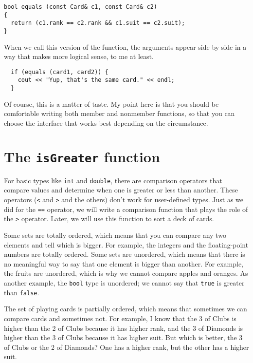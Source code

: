 \begin{lstlisting}
bool equals (const Card& c1, const Card& c2)
{
  return (c1.rank == c2.rank && c1.suit == c2.suit);
}
\end{lstlisting}
%
When we call this version of the function, the arguments
appear side-by-side in a way that makes more logical sense,
to me at least.

\begin{lstlisting}
  if (equals (card1, card2)) {
    cout << "Yup, that's the same card." << endl;
  }
\end{lstlisting}
%
Of course, this is a matter of taste.  My point here is that
you should be comfortable writing both member and nonmember
functions, so that you can choose the interface that works best
depending on the circumstance.

\section{The {\tt isGreater} function}

For basic types like {\tt int} and {\tt double}, there are comparison
operators that compare values and determine when one is greater or
less than another.  These operators ({\tt <} and {\tt >} and the
others) don't work for user-defined types.  Just as we did for the
{\tt ==} operator, we will write a comparison function that plays
the role of the {\tt >} operator.  Later, we will use this function to
sort a deck of cards.


Some sets are totally ordered, which means that you can compare any
two elements and tell which is bigger.  For example, the integers and
the floating-point numbers are totally ordered.  Some sets are
unordered, which means that there is no meaningful way to say that one
element is bigger than another.  For example, the fruits are
unordered, which is why we cannot compare apples and oranges.  As
another example, the {\tt bool} type is unordered; we cannot say that
{\tt true} is greater than {\tt false}.

The set of playing cards is partially ordered, which means that
sometimes we can compare cards and sometimes not.  For example, I know
that the 3 of Clubs is higher than the 2 of Clubs because it has
higher rank, and the 3 of Diamonds is higher than the 3 of Clubs
because it has higher suit.  But which is better, the 3 of Clubs or
the 2 of Diamonds?  One has a higher rank, but the other has a higher
suit.

